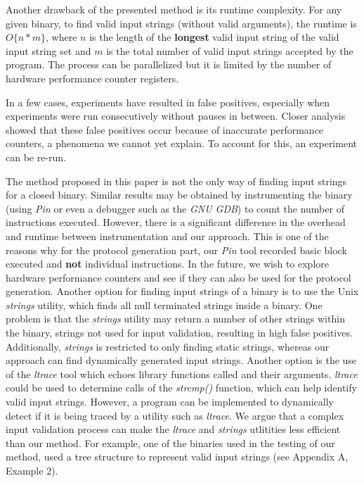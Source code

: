 \documentclass{sig-alternate-05-2015}
\begin{document}
Another drawback of the presented method is its runtime complexity.
For any given binary, to find valid input strings (without valid arguments), the runtime is $O\{n*m\}$, where $n$ is the length of the \textbf{longest} valid input string of the valid input string set and $m$ is the total number of valid input strings accepted by the program.
The process can be parallelized but it is limited by the number of hardware performance counter registers.

In a few cases, experiments have resulted in false positives, especially when experiments were run consecutively without pauses in between.
Closer analysis showed that these false positives occur because of inaccurate performance counters, a phenomena we cannot yet explain.
To account for this, an experiment can be re-run.

The method proposed in this paper is not the only way of finding input strings for a closed binary.
Similar results may be obtained by instrumenting the binary (using \textit{Pin} or even a debugger such as the \textit{GNU GDB}) to count the number of instructions executed.
However, there is a significant difference in the overhead and runtime between instrumentation and our approach.
This is one of the reasons why for the protocol generation part, our \textit{Pin} tool recorded basic block executed and \textbf{not} individual instructions.
In the future, we wish to explore hardware performance counters and see if they can also be used for the protocol generation.
Another option for finding input strings of a binary is to use the Unix \textit{strings} utility, which finds all null terminated strings inside a binary.
One problem is that the \textit{strings} utility may return a number of other strings within the binary, strings not used for input validation, resulting in high false positives.
Additionally, \textit{strings} is restricted to only finding static strings, whereas our approach can find dynamically generated input strings.
Another option is the use of the \textit{ltrace} tool which echoes library functions called and their arguments.
\textit{ltrace} could be used to determine calls of the \textit{strcmp()} function, which can help identify valid input strings.
However, a program can be implemented to dynamically detect if it is being traced by a utility such as \textit{ltrace}.
We argue that a complex input validation process can make the \textit{ltrace} and \textit{strings} utlitities less efficient than our method.
For example, one of the binaries used in the testing of our method, used a tree structure to represent valid input strings (see Appendix A, Example 2).
\end{document}
